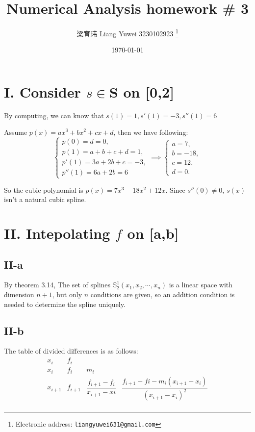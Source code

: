 \documentclass[a4paper]{article}
\begin{document}
\title{Numerical Analysis homework \# 3}

\author{梁育玮 Liang Yuwei 3230102923
  \thanks{Electronic address: \texttt{liangyuwei631@gmail.com}}}
\date{\today}

\maketitle


\section*{I. Consider $s \in \mathbf{S}$ on [0,2]}
By computing, we can know that $s(1) = 1, s'(1)=-3, s''(1) = 6$

Assume $p(x) = ax^3 + bx^2+ cx + d$, then we have following:
\[\begin{cases}
    p(0) = d = 0, \\
    p(1) = a + b + c + d = 1, \\
    p'(1) = 3a + 2b + c = -3, \\
    p''(1) = 6a + 2b = 6
  \end{cases}
  \implies
  \begin{cases}
    a = 7, \\
    b = -18, \\
    c = 12, \\
    d = 0.
  \end{cases}
\]

So the cubic polynomial is $p(x) = 7x^3 - 18x^2 + 12x$. Since $s''(0) \neq 0$, $s(x)$ isn't a natural cubic spline.

\section*{II. Intepolating $f$ on [a,b]}
\subsection*{II-a}
By theorem 3.14, The set of splines $\mathbb{S}^1_2(x_1,x_2,\cdots,x_n)$ is a linear space with dimension $n+1$, but only $n$ conditions are given, so an addition condition is needed to determine the spline uniquely.

\subsection*{II-b}
The table of divided differences is as follows:
\[
\begin{array}{c|ccc}
  x_i & f_i &  &  \\
  x_i & f_i & m_i &  \\
  x_{i+1} & f_{i+1} & \dfrac{f_{i+1}-f_i}{x_{i+1}-x{i}} &  \dfrac{f_{i+1}-f{i}-m_i(x_{i+1}-x_i)}{(x_{i+1}-x_i)^2}\\
\end{array}
\]
\end{document}
